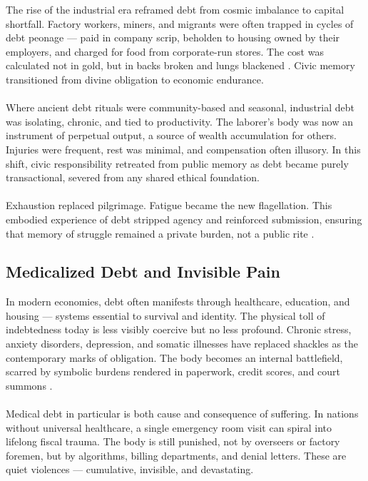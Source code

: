 \documentclass[12pt]{article}
\begin{document}
The rise of the industrial era reframed debt from cosmic imbalance to capital shortfall. Factory workers, miners, and migrants were often trapped in cycles of debt peonage — paid in company scrip, beholden to housing owned by their employers, and charged for food from corporate-run stores. The cost was calculated not in gold, but in backs broken and lungs blackened \parencite{zinn2005people}. Civic memory transitioned from divine obligation to economic endurance.

\paragraph{} Where ancient debt rituals were community-based and seasonal, industrial debt was isolating, chronic, and tied to productivity. The laborer’s body was now an instrument of perpetual output, a source of wealth accumulation for others. Injuries were frequent, rest was minimal, and compensation often illusory. In this shift, civic responsibility retreated from public memory as debt became purely transactional, severed from any shared ethical foundation.

\paragraph{} Exhaustion replaced pilgrimage. Fatigue became the new flagellation. This embodied experience of debt stripped agency and reinforced submission, ensuring that memory of struggle remained a private burden, not a public rite \parencite{berlant2022on}.

\subsection{Medicalized Debt and Invisible Pain}

In modern economies, debt often manifests through healthcare, education, and housing — systems essential to survival and identity. The physical toll of indebtedness today is less visibly coercive but no less profound. Chronic stress, anxiety disorders, depression, and somatic illnesses have replaced shackles as the contemporary marks of obligation. The body becomes an internal battlefield, scarred by symbolic burdens rendered in paperwork, credit scores, and court summons \parencite{davis2019indebted}.

\paragraph{} Medical debt in particular is both cause and consequence of suffering. In nations without universal healthcare, a single emergency room visit can spiral into lifelong fiscal trauma. The body is still punished, not by overseers or factory foremen, but by algorithms, billing departments, and denial letters. These are quiet violences — cumulative, invisible, and devastating.
\end{document}
